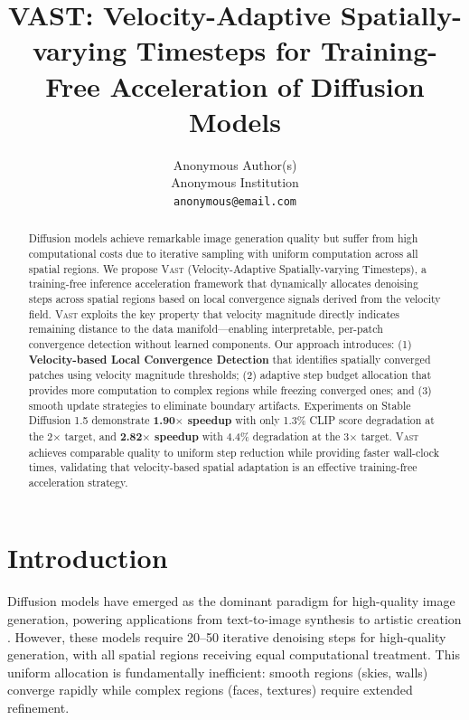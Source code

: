 \documentclass{article}
\title{VAST: Velocity-Adaptive Spatially-varying Timesteps for Training-Free Acceleration of Diffusion Models}
\author{Anonymous Author(s)\\
Anonymous Institution\\
\texttt{anonymous@email.com}
}
\newcommand{\vast}{\textsc{Vast}}
\begin{document}
\maketitle

\begin{abstract}
Diffusion models achieve remarkable image generation quality but suffer from high computational costs due to iterative sampling with uniform computation across all spatial regions. We propose \vast{} (Velocity-Adaptive Spatially-varying Timesteps), a training-free inference acceleration framework that dynamically allocates denoising steps across spatial regions based on local convergence signals derived from the velocity field. \vast{} exploits the key property that velocity magnitude directly indicates remaining distance to the data manifold---enabling interpretable, per-patch convergence detection without learned components. Our approach introduces: (1) \textbf{Velocity-based Local Convergence Detection} that identifies spatially converged patches using velocity magnitude thresholds; (2) adaptive step budget allocation that provides more computation to complex regions while freezing converged ones; and (3) smooth update strategies to eliminate boundary artifacts. Experiments on Stable Diffusion 1.5 demonstrate \textbf{1.90$\times$ speedup} with only 1.3\% CLIP score degradation at the 2$\times$ target, and \textbf{2.82$\times$ speedup} with 4.4\% degradation at the 3$\times$ target. \vast{} achieves comparable quality to uniform step reduction while providing faster wall-clock times, validating that velocity-based spatial adaptation is an effective training-free acceleration strategy.
\end{abstract}

\section{Introduction}
\label{sec:introduction}

Diffusion models have emerged as the dominant paradigm for high-quality image generation, powering applications from text-to-image synthesis to artistic creation \citep{ho2020denoising, peebles2023scalable}. However, these models require 20--50 iterative denoising steps for high-quality generation, with all spatial regions receiving equal computational treatment. This uniform allocation is fundamentally inefficient: smooth regions (skies, walls) converge rapidly while complex regions (faces, textures) require extended refinement.
\end{document}
